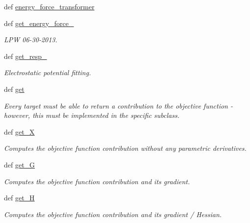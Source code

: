 \begin{DoxyCompactItemize}
\item 
def \hyperlink{classforcebalance_1_1abinitio_1_1AbInitio_a9167da321a9fff748eef5ebe754cc7ca}{energy\-\_\-force\-\_\-transformer}
\item 
def \hyperlink{classforcebalance_1_1abinitio_1_1AbInitio_a313c848f46579817803c8a3ff100974e}{get\-\_\-energy\-\_\-force\-\_\-}
\begin{DoxyCompactList}\small\item\em \-L\-P\-W 06-\/30-\/2013. \end{DoxyCompactList}\item 
def \hyperlink{classforcebalance_1_1abinitio_1_1AbInitio_abfe50569805218075c5942fd3be8bbe7}{get\-\_\-resp\-\_\-}
\begin{DoxyCompactList}\small\item\em \-Electrostatic potential fitting. \end{DoxyCompactList}\item 
def \hyperlink{classforcebalance_1_1abinitio_1_1AbInitio_a2bb3ed7209707f688ec8b731392466b5}{get}
\begin{DoxyCompactList}\small\item\em \-Every target must be able to return a contribution to the objective function -\/ however, this must be implemented in the specific subclass. \end{DoxyCompactList}\item 
def \hyperlink{classforcebalance_1_1target_1_1Target_a606dd136f195c267c05a2455405e5949}{get\-\_\-\-X}
\begin{DoxyCompactList}\small\item\em \-Computes the objective function contribution without any parametric derivatives. \end{DoxyCompactList}\item 
def \hyperlink{classforcebalance_1_1target_1_1Target_afa8cc38c8bba8861c072e789717aa049}{get\-\_\-\-G}
\begin{DoxyCompactList}\small\item\em \-Computes the objective function contribution and its gradient. \end{DoxyCompactList}\item 
def \hyperlink{classforcebalance_1_1target_1_1Target_a1d2ee27fe86a09769c1816af23b09adb}{get\-\_\-\-H}
\begin{DoxyCompactList}\small\item\em \-Computes the objective function contribution and its gradient / \-Hessian. \end{DoxyCompactList}\item 

\end{DoxyCompactItemize}
